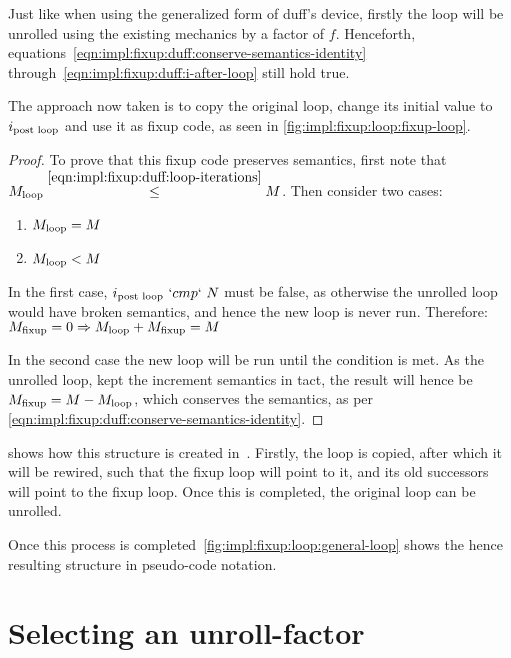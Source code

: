 Just like when using the generalized form of duff's device, firstly the loop will be unrolled using the existing mechanics by a factor of $f$.
Henceforth, equations~\ref{eqn:impl:fixup:duff:conserve-semantics-identity} through~\ref{eqn:impl:fixup:duff:i-after-loop} still hold true.

The approach now taken is to copy the original loop, change its initial value to $i_\text{post loop}$ and use it as fixup code, as seen in \cref{fig:impl:fixup:loop:fixup-loop}.



\begin{proof}
    To prove that this fixup code preserves semantics, first note that $M_{\text{loop}} \overset{\ref{eqn:impl:fixup:duff:loop-iterations}}{\leq} M$.
    Then consider two cases:
    \begin{enumerate}
        \item $M_{\text{loop}} = M$
        \item $M_{\text{loop}} < M$
    \end{enumerate}
    In the first case, $i_\text{post loop}~`cmp`~N$ must be false, as otherwise the unrolled loop would have broken semantics, and hence the new loop is never run.
    Therefore: $M_{\text{fixup}} = 0 \Rightarrow M_{\text{loop}} + M_{\text{fixup}} = M$

    In the second case the new loop will be run until the condition is met.
    As the unrolled loop, kept the increment semantics in tact, the result will hence be $M_{\text{fixup}} = M - M_{\text{loop}}$, which conserves the semantics, as per \cref{eqn:impl:fixup:duff:conserve-semantics-identity}.
\end{proof}

 shows how this structure is created in~\libFIRM.
Firstly, the loop is copied, after which it will be rewired, such that the fixup loop will point to it, and its old successors will point to the fixup loop.
Once this is completed, the original loop can be unrolled.



Once this process is completed~\cref{fig:impl:fixup:loop:general-loop} shows the hence resulting structure in pseudo-code notation.



\section{Selecting an unroll-factor}\label{sec:impl:sel-factor}


